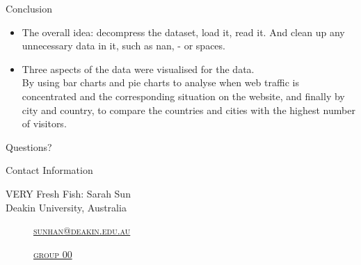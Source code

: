 \documentclass[
 size=14pt,
 paper=smartboard,  %
 mode=present, 		%
 display=slides, 	%
 style=tuliplab,  	%
 pauseslide,
 fleqn,leqno]{powerdot}
\begin{document}
\begin{slide}[toc=,bm=]{Conclusion}
\begin{itemize}
\item
\smallskip
The overall idea: decompress the dataset, load it, read it. And clean up any unnecessary data in it, such as nan, - or spaces.

\item
\smallskip
Three aspects of the data were visualised for the data.\\

By using bar charts and pie charts to analyse when web traffic is concentrated and the corresponding situation on the website, and finally by city and country, to compare the countries and cities with the highest number of visitors.

\end{itemize}



\end{slide}


%
\begin{slide}[toc=,bm=]{Questions?}
\begin{center}
\begin{figure}
\end{figure}
\end{center}
\end{slide}


\begin{wideslide}[toc=,bm=]{Contact Information}
\centering
{}
\twocolumn[
lcolwidth=0.35\linewidth,
rcolwidth=0.65\linewidth
]
{
}
{
VERY Fresh Fish: Sarah Sun\\
Deakin University, Australia
\begin{description}
 \item[\textcolor{orange}{\faEnvelope}] \href{mailto:sunhan@deakin.edu.au}
 {\textsc{\footnotesize{sunhan@deakin.edu.au}}}

 \item[\textcolor{orange}{\faHome}] \href{http://www.tulip.org.au}
 {\textsc{\footnotesize{group 00}}}
\end{description}
}
\end{wideslide}
\end{document}
